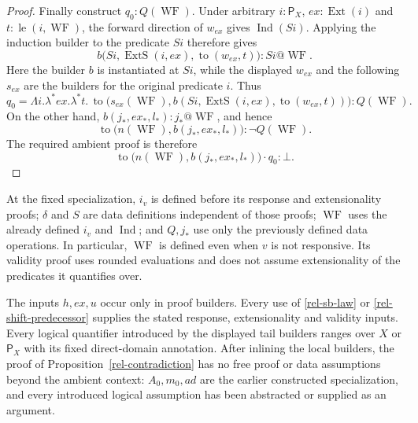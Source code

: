 \begin{proof}
Finally construct $q_0:Q(\operatorname{WF})$.  Under arbitrary
$i:\mathsf P_X$, $ex:\operatorname{Ext}(i)$ and
$t:\operatorname{le}(i,\operatorname{WF})$, the forward direction
of $w_{ex}$ gives $\operatorname{Ind}(Si)$.  Applying the induction
builder to the predicate $Si$ therefore gives
\[
 b\bigl(Si,\operatorname{ExtS}(i,ex),
                 \operatorname{to}(w_{ex},t)\bigr):Si@\operatorname{WF}.
\]
Here the builder $b$ is instantiated at $Si$, while the displayed
$w_{ex}$ and the following $s_{ex}$ are the builders for the
original predicate $i$.  Thus
\[
 q_0=\Lambda i.\lambda^*ex.\lambda^*t.\,
 \operatorname{to}\bigl(s_{ex}(\operatorname{WF}),
       b(Si,\operatorname{ExtS}(i,ex),
                        \operatorname{to}(w_{ex},t))\bigr)
       :Q(\operatorname{WF}).
\]
On the other hand,
$b(j_*,ex_*,l_*):j_*@\operatorname{WF}$, and hence
\[
 \operatorname{to}\bigl(n(\operatorname{WF}),
                      b(j_*,ex_*,l_*)\bigr)
                  :\neg Q(\operatorname{WF}).
\]
The required ambient proof is therefore
\[
 \operatorname{to}\bigl(n(\operatorname{WF}),
                      b(j_*,ex_*,l_*)\bigr)\cdot q_0:\bot.
\]
\end{proof}

\begin{remark}
\label{rel-diagonal-dependencies}
At the fixed specialization, $i_v$ is defined before its
response and extensionality proofs; $\delta$ and $S$ are data
definitions independent of those proofs; $\operatorname{WF}$ uses
the already defined $i_v$ and $\operatorname{Ind}$; and $Q,j_*$ use
only the previously defined data operations.  In particular,
$\operatorname{WF}$ is defined even when $v$ is not responsive.
Its validity proof uses rounded evaluations and does not assume
extensionality of the predicates it quantifies over.

The inputs $h,ex,u$ occur only in proof builders.  Every use of
\eqref{rel-sb-law} or \eqref{rel-shift-predecessor} supplies the
stated response, extensionality and validity inputs.  Every logical
quantifier introduced by the displayed tail builders ranges over
$X$ or $\mathsf P_X$ with its fixed direct-domain annotation.
After inlining the local builders,
the proof of Proposition~\ref{rel-contradiction} has no free proof
or data assumptions beyond the ambient context: $A_0,m_0,ad$ are
the earlier constructed specialization, and every introduced
logical assumption has been abstracted or supplied as an argument.
\end{remark}
